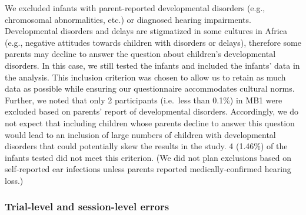 \documentclass[
  english,
  ,man,floatsintext]{apa6}
\begin{document}
We excluded infants with parent-reported developmental disorders (e.g., chromosomal abnormalities, etc.) or diagnosed hearing impairments. Developmental disorders and delays are stigmatized in some cultures in Africa (e.g., negative attitudes towards children with disorders or delays), therefore some parents may decline to answer the question about children's developmental disorders. In this case, we still tested the infants and included the infants' data in the analysis. This inclusion criterion was chosen to allow us to retain as much data as possible while ensuring our questionnaire accommodates cultural norms. Further, we noted that only 2 participants (i.e.~less than 0.1\%) in MB1 were excluded based on parents' report of developmental disorders. Accordingly, we do not expect that including children whose parents decline to answer this question would lead to an inclusion of large numbers of children with developmental disorders that could potentially skew the results in the study. 4 (1.46\%) of the infants tested did not meet this criterion. (We did not plan exclusions based on self-reported ear infections unless parents reported medically-confirmed hearing loss.)

\subsubsection{Trial-level and session-level errors}\label{trial-level-and-session-level-errors}
\end{document}
